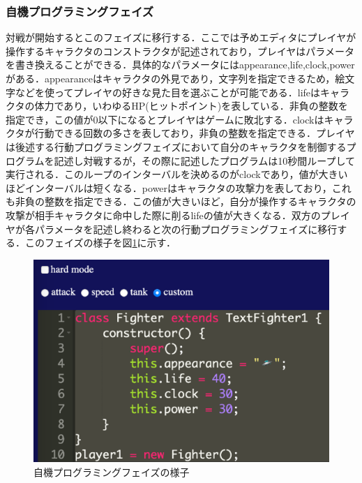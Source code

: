 \subsubsection{自機プログラミングフェイズ}
対戦が開始するとこのフェイズに移行する．ここでは予めエディタにプレイヤが操作するキャラクタのコンストラクタが記述されており，プレイヤはパラメータを書き換えることができる．具体的なパラメータにはappearance,life,clock,powerがある．appearanceはキャラクタの外見であり，文字列を指定できるため，絵文字などを使ってプレイヤの好きな見た目を選ぶことが可能である．lifeはキャラクタの体力であり，いわゆるHP(ヒットポイント)を表している．非負の整数を指定でき，この値が0以下になるとプレイヤはゲームに敗北する．clockはキャラクタが行動できる回数の多さを表しており，非負の整数を指定できる．プレイヤは後述する行動プログラミングフェイズにおいて自分のキャラクタを制御するプログラムを記述し対戦するが，その際に記述したプログラムは10秒間ループして実行される．このループのインターバルを決めるのがclockであり，値が大きいほどインターバルは短くなる．powerはキャラクタの攻撃力を表しており，これも非負の整数を指定できる．この値が大きいほど，自分が操作するキャラクタの攻撃が相手キャラクタに命中した際に削るlifeの値が大きくなる．双方のプレイヤが各パラメータを記述し終わると次の行動プログラミングフェイズに移行する．このフェイズの様子を図\ref{characterProgramming}に示す．

\begin{figure}[!h]
  \begin{center}
    \includegraphics[width=1.0\linewidth]{image/characterProgramming.eps}
  \end{center}
    \vspace{-8mm} 
  \caption{自機プログラミングフェイズの様子}
  \label{characterProgramming}
\end{figure}


